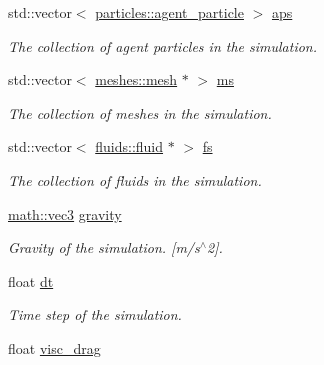 \begin{DoxyCompactItemize}
std\+::vector$<$ \hyperlink{classphysim_1_1particles_1_1agent__particle}{particles\+::agent\+\_\+particle} $>$ \hyperlink{classphysim_1_1simulator_a838f036ef9d378d1e3f5207c3f031b52}{aps}
\begin{DoxyCompactList}\small\item\em The collection of agent particles in the simulation. \end{DoxyCompactList}\item 
\mbox{\label{classphysim_1_1simulator_ae2bcb1ad81b487abd2ad00b0118d2f51}} 
std\+::vector$<$ \hyperlink{classphysim_1_1meshes_1_1mesh}{meshes\+::mesh} $\ast$ $>$ \hyperlink{classphysim_1_1simulator_ae2bcb1ad81b487abd2ad00b0118d2f51}{ms}
\begin{DoxyCompactList}\small\item\em The collection of meshes in the simulation. \end{DoxyCompactList}\item 
\mbox{\label{classphysim_1_1simulator_a34f5a69a58c9106cf42657c0700074e7}} 
std\+::vector$<$ \hyperlink{classphysim_1_1fluids_1_1fluid}{fluids\+::fluid} $\ast$ $>$ \hyperlink{classphysim_1_1simulator_a34f5a69a58c9106cf42657c0700074e7}{fs}
\begin{DoxyCompactList}\small\item\em The collection of fluids in the simulation. \end{DoxyCompactList}\item 
\mbox{\label{classphysim_1_1simulator_a2b5bd96495bd4cae9f6e9eda4b521140}} 
\hyperlink{structphysim_1_1math_1_1vec3}{math\+::vec3} \hyperlink{classphysim_1_1simulator_a2b5bd96495bd4cae9f6e9eda4b521140}{gravity}
\begin{DoxyCompactList}\small\item\em Gravity of the simulation. \mbox{[}m/s$^\wedge$2\mbox{]}. \end{DoxyCompactList}\item 
float \hyperlink{classphysim_1_1simulator_a12a60d0ed819937b51ce50162dbdd6e1}{dt}
\begin{DoxyCompactList}\small\item\em Time step of the simulation. \end{DoxyCompactList}\item 
float \hyperlink{classphysim_1_1simulator_a307fe3207801e5497e690facc58fa8f5}{visc\+\_\+drag}

\end{DoxyCompactItemize}
